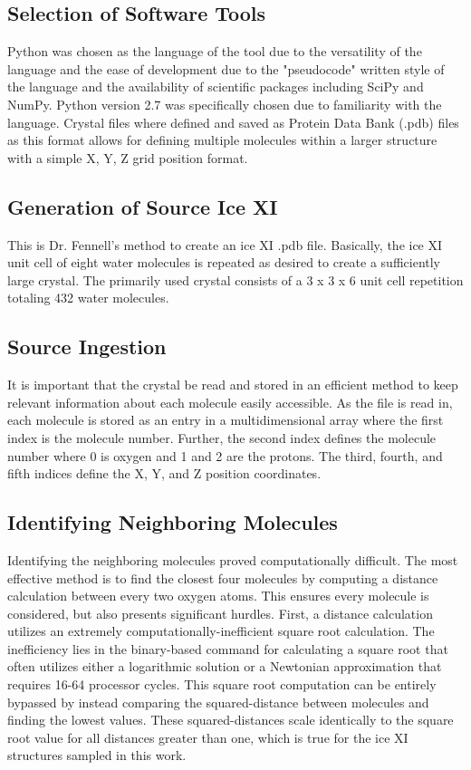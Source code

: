 \subsection{Selection of Software Tools}

Python was chosen as the language of the tool due to the versatility of the language and the ease of development due to the "pseudocode" written style of the language and the availability of scientific packages including SciPy and NumPy. 
Python version 2.7 was specifically chosen due to familiarity with the language.
Crystal files where defined and saved as Protein Data Bank (.pdb) files as this format allows for defining multiple molecules within a larger structure with a simple X, Y, Z grid position format. 

\subsection{Generation of Source Ice XI}

This is Dr. Fennell's method to create an ice XI .pdb file. 
Basically, the ice XI unit cell of eight water molecules is repeated as desired to create a sufficiently large crystal.
The primarily used crystal consists of a 3 x 3 x 6 unit cell repetition totaling 432 water molecules.

\subsection{Source Ingestion}

It is important that the crystal be read and stored in an efficient method to keep relevant information about each molecule easily accessible. 
As the file is read in, each molecule is stored as an entry in a multidimensional array where the first index is the molecule number. 
Further, the second index defines the molecule number where 0 is oxygen and 1 and 2 are the protons. 
The third, fourth, and fifth indices define the X, Y, and Z position coordinates. 

\subsection{Identifying Neighboring Molecules}

Identifying the neighboring molecules proved computationally difficult. 
The most effective method is to find the closest four molecules by computing a distance calculation between every two oxygen atoms.
This ensures every molecule is considered, but also presents significant hurdles.
First, a distance calculation utilizes an extremely computationally-inefficient square root calculation.
The inefficiency lies in the binary-based command for calculating a square root that often utilizes either a logarithmic solution or a Newtonian approximation that requires 16-64 processor cycles.
This square root computation can be entirely bypassed by instead comparing the squared-distance between molecules and finding the lowest values.
These squared-distances scale identically to the square root value for all distances greater than one, which is true for the ice XI structures sampled in this work.

